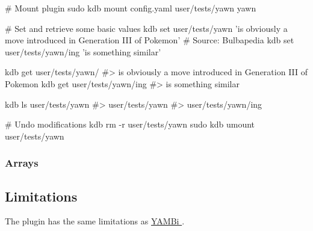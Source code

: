 \begin{DoxyCode}
# Mount plugin
sudo kdb mount config.yaml user/tests/yawn yawn

# Set and retrieve some basic values
kdb set user/tests/yawn 'is obviously a move introduced in Generation III of Pokemon' # Source: Bulbapedia
kdb set user/tests/yawn/ing 'is something similar'

kdb get user/tests/yawn/
#> is obviously a move introduced in Generation III of Pokemon
kdb get user/tests/yawn/ing
#> is something similar

kdb ls user/tests/yawn
#> user/tests/yawn
#> user/tests/yawn/ing

# Undo modifications
kdb rm -r user/tests/yawn
sudo kdb umount user/tests/yawn
\end{DoxyCode}


\subsubsection*{Arrays}




\subsection*{Limitations}

The plugin has the same limitations as \hyperlink{md_src_plugins_yambi_README_src_plugins_yambi_README_md}{Y\+A\+M\+Bi }. 
